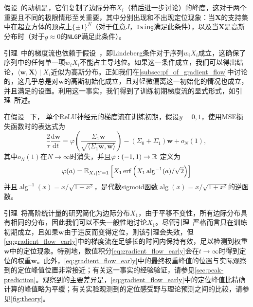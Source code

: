 假设~的动机是，它们复制了边际分布$X_i$（稍后进一步讨论）的峰度，这对于两个重要且不同的极限情形至关重要，其中分别出现和不出现定位现象：当$\mathbf{X}$的支持集中在超立方体的顶点上$\{ \pm 1 \}^N$（对于任意$J$，\texttt{Ising}满足此条件），以及当$\mathbf{X}$是高斯分布时（对于$g \approx 0$的\texttt{NLGP}满足此条件）。

引理~中的梯度流也依赖于假设~，即Lindeberg条件对于序列$w_i X_i$成立，这确保了序列中的任何单一项$w_i X_i$不能占主导地位。如果这一条件成立，我们可以得出结论，$\langle \mathbf{w}, \mathbf{X} \rangle \mid X_i$近似为高斯分布。正如我们在\cref{subsec:pf_of_gradient_flow}中讨论的，这几乎总是对$\mathbf{w}$的高斯初始化成立，且对轻微偏离这一初始化的情况也成立，并且满足\textcite{ingrosso2022data}的设置。利用这一事实，我们得到了训练初期梯度流的显式形式，如引理~所述。

\begin{lemma} \label{lem:gradient_flow}
    在假设~ 下，
    单个ReLU神经元的梯度流在训练初期，假设$y = 0, 1$，使用MSE损失函数时的表达式为
    \begin{equation} \label{eq:gradient_flow_early}
      \frac{2}{\tau} \frac{\mathrm{d}\mathbf{w}}{\mathrm{d}t} = \varphi\left( \frac{\Sigma_1 \mathbf{w}}{\sqrt{\langle \Sigma_1 \mathbf{w}, \mathbf{w} \rangle}} \right) - ( \Sigma_0 + \Sigma_1 ) \mathbf{w} + o_N(1),
    \end{equation}
    其中$o_N(1)$在$N\to\infty$时消失，并且$\varphi : (-1,1) \to \operatorname{\mathbb{R}}$ 定义为
    \begin{equation} \label{eq:varphi}
        \varphi(a) = \operatorname{\mathbb{E}}_{X_1 \mid Y = 1}\left[ X_1 \operatorname{erf}\left( X_1 \operatorname{alg}^{-1}(a) / \sqrt{2} \right)
        \right]
    \end{equation}
    并且$\operatorname{alg}^{-1}(x) = x/\sqrt{1-x^2}$，是代数sigmoid函数$\operatorname{alg}(x) = x/\sqrt{1+x^2}$的逆函数。
\end{lemma}
引理~将高阶统计量的研究简化为边际分布$X_1$，由于平移不变性，所有边际分布具有相同的分布，因此我们可以不失一般性地讨论$X_1$。尽管引理~严格而言只在训练初期成立，且如果$\mathbf{w}$由于违反而变得定位，则该引理会失效，但\cref{eq:gradient_flow_early}中的梯度流在足够长的时间内保持有效，足以检测到权重$\mathbf{w}$中的定位现象。特别地，数值积分\cref{eq:gradient_flow_early}会在$t \to \infty$时得到定位的权重$\mathbf{w}$。此外，\cref{eq:gradient_flow_early}中的最终权重峰值的位置与实际观察到的定位峰值位置非常接近；有关这一事实的经验验证，请参见\cref{sec:peak-prediction}。观察到的主要差异是，\cref{eq:gradient_flow_early}中的定位峰值比精确计算的峰值略为平缓；有关实验观测到的定位感受野与理论预测之间的比较，请参见\cref{fig:theory}。
